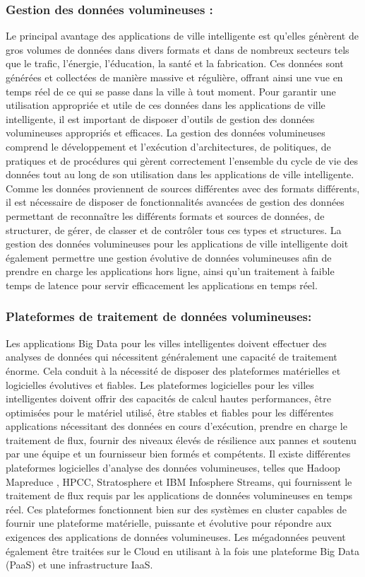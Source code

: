 \documentclass[french, a4paper, 12pt]{report}
\begin{document}
\subsubsection{Gestion des données volumineuses : }
Le principal avantage des applications de ville intelligente est qu’elles génèrent de gros volumes de données dans divers formats et dans de nombreux secteurs tels que le trafic, l’énergie, l’éducation, la santé et la fabrication. Ces données sont générées et collectées de manière massive et régulière, offrant ainsi une vue en temps réel de ce qui se passe dans la ville à tout moment. Pour garantir une utilisation appropriée et utile de ces données dans les applications de ville intelligente, il est important de disposer d'outils de gestion des données volumineuses appropriés et efficaces. La gestion des données volumineuses comprend le développement et l'exécution d'architectures, de politiques, de pratiques et de procédures qui gèrent correctement l'ensemble du cycle de vie des données tout au long de son utilisation dans les applications de ville intelligente. Comme les données proviennent de sources différentes avec des formats différents, il est nécessaire de disposer de fonctionnalités avancées de gestion des données permettant de reconnaître les différents formats et sources de données, de structurer, de gérer, de classer et de contrôler tous ces types et structures. La gestion des données volumineuses pour les applications de ville intelligente doit également permettre une gestion évolutive de données volumineuses afin de prendre en charge les applications hors ligne, ainsi qu'un traitement à faible temps de latence pour servir efficacement les applications en temps réel.\\
\subsubsection{Plateformes de traitement de données volumineuses:}
Les applications Big Data pour les villes intelligentes doivent effectuer des analyses de données qui nécessitent généralement une capacité de traitement énorme. Cela conduit à la nécessité de disposer des plateformes matérielles et logicielles évolutives et fiables. Les plateformes logicielles pour les villes intelligentes doivent offrir des capacités de calcul hautes performances, être optimisées pour le matériel utilisé, être stables et fiables pour les différentes applications nécessitant des données en cours d'exécution, prendre en charge le traitement de flux, fournir des niveaux élevés de résilience aux pannes et soutenu par une équipe et un fournisseur bien formés et compétents. Il existe différentes plateformes logicielles d'analyse des données volumineuses, telles que Hadoop Mapreduce , HPCC, Stratosphere et IBM Infosphere Streams, qui fournissent le traitement de flux requis par les applications de données volumineuses en temps réel. Ces plateformes fonctionnent bien sur des systèmes en cluster capables de fournir une plateforme matérielle, puissante et évolutive pour répondre aux exigences des applications de données volumineuses. Les mégadonnées peuvent également être traitées sur le Cloud en utilisant à la fois une plateforme Big Data (PaaS) et une infrastructure IaaS.\\
\end{document}
